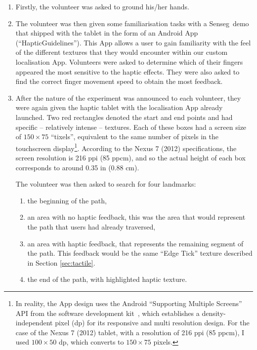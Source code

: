 \begin{enumerate}

\item Firstly, the volunteer was asked to ground his/her hands. 

\item The volunteer was then given some familiarisation tasks with a Senseg\texttrademark\ demo that shipped with the tablet in the form of an Android App (``HapticGuidelines''). This App allows a user to gain familiarity with the feel of the different textures that they would encounter within our custom localisation App. Volunteers were asked to determine which of their fingers appeared the most sensitive to the haptic effects.  They were also asked to find the correct finger movement speed to obtain the most feedback. 

\item After the nature of the experiment was announced to each volunteer, they were again given the haptic tablet with the localisation App already launched. Two red rectangles denoted the start and end points and had specific -- relatively intense -- textures. Each of these boxes had a screen size of $150 \times 75$ ``tixels'', equivalent to the same number of pixels in the touchscreen display\footnote{In reality, the App design uses the Android ``Supporting Multiple Screens'' API from the software development kit~\citep{AndroidAPI}, which establishes a density-independent pixel (dp) for its responsive and multi resolution design. For the case of the Nexus 7 (2012) tablet, with a resolution of 216 ppi (85 ppcm), I used $100 \times 50$ dp, which converts to $150 \times 75$ pixels.}. According to the Nexus 7 (2012) specifications, the screen resolution is 216 ppi (85 ppcm), and so the actual height of each box corresponds to around 0.35 in (0.88 cm). 

The volunteer was then asked to search for four landmarks: 

\begin{enumerate}
\item the beginning of the path,
\item an area with no haptic feedback, this was the area that would represent the path that users had already traversed,
\item an area with haptic feedback, that represents the remaining segment of the path. This feedback would be the same ``Edge Tick'' texture described in Section \ref{sec:tactile}.
\item the end of the path, with highlighted haptic texture.
\end{enumerate}


\end{enumerate}
